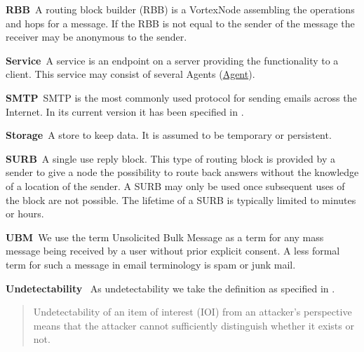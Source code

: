 \documentclass[a4paper,appendixprefix,pdfusetitle,twocolumn,fontsize=8pt,DIV=calc,8pt,draft]{\doctype} %
\newenvironment{entry}{\par\leavevmode\hangpara{1.5mm}{1}\ignorespaces}{\RaggedRight\par}
\newcommand*{\mainentry}[2]{{\bfseries{#1\label{def:#1}}}~#2\par}
\newcommand*{\defref}[1]{\hyperref[def:#1]{#1}}
\begin{document}
\begin{entry}
	\mainentry{RBB}{A routing block builder (RBB) is a VortexNode assembling the operations and hops for a message. If the RBB is not equal to the sender of the message the receiver may be anonymous to the sender.}
\end{entry}

\begin{entry}
	\mainentry{Service}{A service is an endpoint on a server providing the functionality to a client. This service may consist of several Agents (\defref{Agent}).}
\end{entry}

\begin{entry}
	\mainentry{SMTP}{SMTP is the most commonly used protocol for sending emails across the Internet. In its current version it has been specified in \cite{RFC5321}.}
\end{entry}

\begin{entry}
	\mainentry{Storage}{A store to keep data. It is assumed to be temporary or persistent.}
\end{entry}

\begin{entry}
	\mainentry{SURB}{A single use reply block. This type of routing block is provided by a sender to give a node the possibility to route back answers without the knowledge of a location of the sender. A SURB may only be used once subsequent uses of the block are not possible. The lifetime of a SURB is typically limited to minutes or hours.}
\end{entry}

\begin{entry}
	\mainentry{UBM}{We use the term Unsolicited Bulk Message as a term for any mass message being received by a user without prior explicit consent. A less formal term for such a message in email terminology is spam or junk mail.}
\end{entry}

\begin{entry}
	\mainentry{Undetectability}{
		As undetectability we take the definition as specified in \cite{anonTerminology}.
		\begin{quote}
			Undetectability of an item of interest (IOI\index{Item of Interest}) from an attacker's perspective means that the
			attacker cannot sufficiently distinguish whether it exists or not.\omitted
		\end{quote}
	}
\end{entry}
\end{document}
